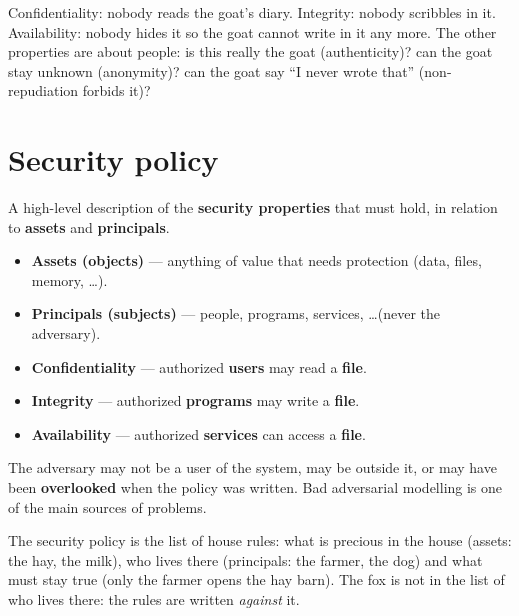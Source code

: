 \begin{goatbox}
Confidentiality: nobody reads the goat's diary. Integrity: nobody scribbles in it. Availability:
nobody hides it so the goat cannot write in it any more. The other properties are about people:
is this really the goat (authenticity)? can the goat stay unknown (anonymity)? can the goat say
``I never wrote that'' (non-repudiation forbids it)?
\end{goatbox}

\section{Security policy}

\begin{defnbox}[title=Security policy]
A high-level description of the \textbf{security properties} that must hold, in
relation to \textbf{assets} and \textbf{principals}.
\begin{itemize}
  \item \textbf{Assets (objects)} — anything of value that needs protection (data, files, memory, \ldots).
  \item \textbf{Principals (subjects)} — people, programs, services, \ldots (never the adversary).
\end{itemize}
\end{defnbox}

\begin{propbox}[title=Properties in terms of principals and assets]
\begin{itemize}
  \item \textbf{Confidentiality} — authorized \textbf{users} may read a \textbf{file}.
  \item \textbf{Integrity} — authorized \textbf{programs} may write a \textbf{file}.
  \item \textbf{Availability} — authorized \textbf{services} can access a \textbf{file}.
\end{itemize}
\end{propbox}

\begin{warnbox}[title=Why can the principals not contain the adversary?]
The adversary may not be a user of the system, may be outside it, or may have been
\textbf{overlooked} when the policy was written. Bad adversarial modelling is one of the main
sources of problems.
\end{warnbox}

\begin{goatbox}
The security policy is the list of house rules: what is precious in the house (assets: the hay,
the milk), who lives there (principals: the farmer, the dog) and what must stay true (only the
farmer opens the hay barn). The fox is not in the list of who lives there: the rules are written
\emph{against} it.
\end{goatbox}

